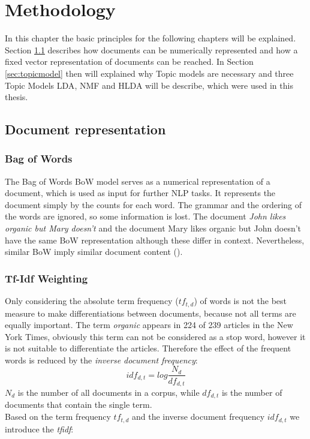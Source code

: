 \chapter{Methodology}
\label{methodology}
In this chapter the basic principles for the following chapters will be explained.
Section \ref{sec:docrep} describes how documents can be numerically represented and how a fixed vector representation of documents can be reached. In Section \ref{sec:topicmodel} then will explained why Topic models are necessary and three Topic Models \ac{LDA}, \ac{NMF} and \ac{HLDA} will be describe, which were used in this thesis.

\section{Document representation}
\label{sec:docrep}
\subsection{Bag of Words}
The Bag of Words \ac{BoW} model serves as a numerical representation of a document, which is used as input for further \ac{NLP} tasks.
It represents the document simply by the counts for each word. The grammar and the ordering of the words are ignored, so some information is lost. The document \textit{John likes organic but Mary doesn't} and the document {Mary likes organic but John doesn't} have the same \ac{BoW} representation although these differ in context. Nevertheless, similar \ac{BoW} imply similar document content (\cite{Manning2008}). 

\subsection{Tf-Idf Weighting}
Only considering the absolute term frequency ($tf_{t,d}$) of words is not the best measure to make differentiations between documents, because not all terms are equally important. 
The term \textit{organic} appears in  224 of 239 articles in the New York Times, obviously this term can not be considered as a stop word, however it is not suitable to differentiate the articles. Therefore the effect of the frequent words is reduced by the \textit{inverse document frequency}:
\begin{equation}
	idf_{d,t} = log\dfrac{N_{d}}{df_{d,t}}
\end{equation}
$N_{d}$ is the number of all documents in a corpus, while $df_{d,t}$ is the number of documents that contain the single term.\\
Based on the term frequency $tf_{t,d}$ and the inverse document frequency $idf_{d,t}$ we introduce the \textit{\ac{tfidf}}: 

